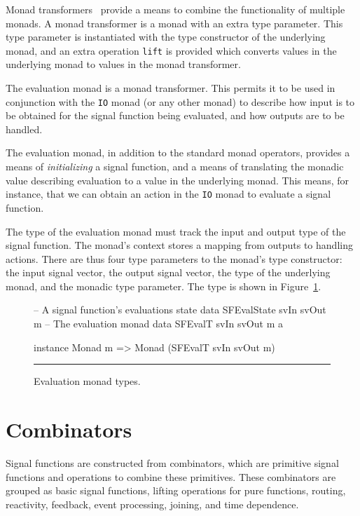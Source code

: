 Monad transformers~\cite{Jones1995} provide a means to combine the functionality
of multiple monads. A monad transformer is a monad with an extra type parameter.
This type parameter is instantiated with the type constructor of the underlying
monad, and an extra operation {\tt lift} is provided which converts values in
the underlying monad to values in the monad transformer.

The evaluation monad is a monad transformer. This permits it to be used in
conjunction with the {\tt IO} monad (or any other monad) to describe how input
is to be obtained for the signal function being evaluated, and how outputs are
to be handled.

The evaluation monad, in addition to the standard monad operators, provides a
means of {\em initializing} a signal function, and a means of translating the
monadic value describing evaluation to a value in the underlying monad. This
means, for instance, that we can obtain an action in the {\tt IO} monad to
evaluate a signal function.

The type of the evaluation monad must track the input and output type of the
signal function. The monad's context stores a mapping from outputs to handling
actions. There are thus four type parameters to the monad's type
constructor: the input signal vector, the output signal vector, the type of the
underlying monad, and the monadic type parameter. The type is shown in
Figure~\ref{figure:evaluation_monad_types}.

\begin{figure}
\begin{code}
-- A signal function's evaluations state
data SFEvalState svIn svOut m
-- The evaluation monad
data SFEvalT svIn svOut m a

instance Monad m => Monad (SFEvalT svIn svOut m)
\end{code}
\hrule
\caption{Evaluation monad types.}
\label{figure:evaluation_monad_types}
\end{figure}

\section{Combinators}
\label{section:System_Design_and_Interface-Combinators}

Signal functions are constructed from combinators, which are primitive signal
functions and operations to combine these primitives. These combinators are
grouped as basic signal functions, lifting operations for pure functions,
routing, reactivity, feedback, event processing, joining, and time dependence.

